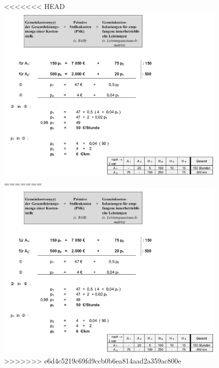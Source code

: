 \documentclass[a4paper,11pt, twoside]{article}
\begin{document}
\begin{figure}[h]
 \begin{center}
<<<<<<< HEAD
   \includegraphics[scale=0.6]{bilder/leistungsverechnung1.png}
=======
   \includegraphics[scale=0.5]{bilder/leistungsverechnung1.png}
>>>>>>> e6d4c5219c69fd9ccb0b6ea814aad2a359ac800e
 \end{center}
\end{figure}
\end{document}

